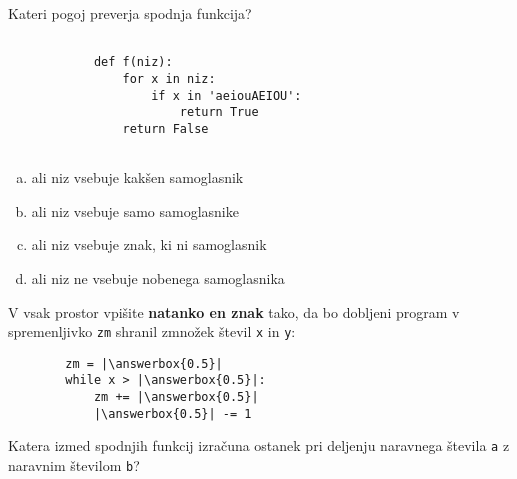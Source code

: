 \documentclass[arhiv, 10pt]{../izpit}
\newcommand{\inlinepy}[1]{\texttt{#1}}
\newcommand{\answerbox}[1]{\framebox{\vphantom{\large M}\hspace{#1cm}}}
\begin{document}
        \naloga*

        \begin{multicols}{2}
        \noindent
        Kateri pogoj preverja spodnja funkcija?
        \begin{verbatim}
        
            def f(niz):
                for x in niz:
                    if x in 'aeiouAEIOU':
                        return True
                return False
            
        \end{verbatim}

        \begin{enumerate}[(a)]
\item ali niz vsebuje kakšen samoglasnik
\item ali niz vsebuje samo samoglasnike
\item ali niz vsebuje znak, ki ni samoglasnik
\item ali niz ne vsebuje nobenega samoglasnika
\end{enumerate}

        \end{multicols}
    
        \naloga*
        \begin{multicols}{2}
        \noindent
        V vsak prostor vpišite \textbf{natanko en znak} tako, da bo dobljeni program v spremenljivko \inlinepy{zm} shranil zmnožek števil \inlinepy{x} in \inlinepy{y}:
        
        \columnbreak
        \begin{verbatim}
        zm = |\answerbox{0.5}|
        while x > |\answerbox{0.5}|:
            zm += |\answerbox{0.5}|
            |\answerbox{0.5}| -= 1
        \end{verbatim}
        \end{multicols}
    
        \clearpage
        \naloga
        
        Katera izmed spodnjih funkcij izračuna ostanek pri deljenju naravnega števila \inlinepy{a} z naravnim številom \inlinepy{b}?
    
\end{document}
